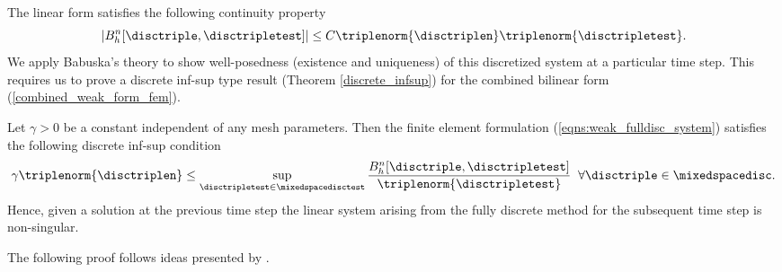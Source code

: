 The linear form  satisfies the following continuity property
\begin{equation*}
|B_{h}^{n}[\disctriple,\disctripletest] | \leq C \triplenorm{\disctriplen} \triplenorm{\disctripletest}.
\end{equation*}
We apply Babuska's theory \cite{babuvska1971error} to show well-posedness (existence and uniqueness) of this discretized system at a particular time step. This requires us to prove a discrete inf-sup type result (Theorem \ref{discrete_infsup}) for the combined bilinear form (\ref{combined_weak_form_fem}).
\begin{theorem}
\label{discrete_infsup}
Let $\gamma>0$ be a constant independent of any mesh parameters. Then the finite element formulation (\ref{eqns:weak_fulldisc_system}) satisfies the following discrete inf-sup condition
\begin{equation}
  \gamma \triplenorm{\disctriplen} \leq \sup_{\disctripletest \in \mixedspacedisctest}\frac{B_{h}^{n}[\disctriple,\disctripletest]}{\triplenorm{\disctripletest}} \;\; \forall \disctriple \in \mixedspacedisc.
\end{equation}
Hence, given a solution at the previous time step the linear system arising from the fully discrete method for the subsequent time step is non-singular.
\end{theorem}
\noindent The following proof follows ideas presented by \cite{burman2007unified}.\newline
